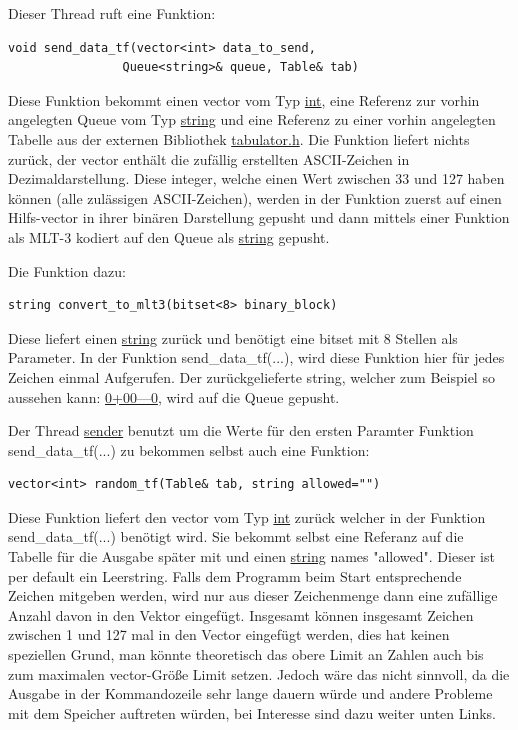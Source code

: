 \documentclass{article}
\begin{document}
Dieser Thread ruft eine Funktion:
\begin{lstlisting}
void send_data_tf(vector<int> data_to_send,
				Queue<string>& queue, Table& tab)
\end{lstlisting}

Diese Funktion bekommt einen vector vom Typ \underline{int}, eine Referenz zur vorhin angelegten Queue vom Typ \underline{string} und eine Referenz zu einer vorhin
angelegten Tabelle aus der externen Bibliothek \underline{tabulator.h}. Die Funktion liefert nichts zurück, der vector enthält die zufällig erstellten ASCII-Zeichen in Dezimaldarstellung.
Diese integer, welche einen Wert zwischen 33 und 127 haben können (alle zulässigen ASCII-Zeichen), werden in der Funktion zuerst auf einen Hilfs-vector in ihrer binären Darstellung
gepusht und dann mittels einer Funktion als MLT-3 kodiert auf den Queue als \underline{string} gepusht. 

Die Funktion dazu:
\begin{lstlisting}
string convert_to_mlt3(bitset<8> binary_block)
\end{lstlisting}

Diese liefert einen \underline{string} zurück und benötigt eine bitset mit 8 Stellen als Parameter. In der Funktion send\_data\_tf(...), wird diese Funktion hier für jedes Zeichen
einmal Aufgerufen. Der zurückgelieferte string, welcher zum Beispiel so aussehen kann: \underline{0+00---0}, wird auf die Queue gepusht.

Der Thread \underline{sender} benutzt um die Werte für den ersten Paramter Funktion send\_data\_tf(...) zu bekommen selbst auch eine Funktion:
\begin{lstlisting}
vector<int> random_tf(Table& tab, string allowed="")
\end{lstlisting}

Diese Funktion liefert den vector vom Typ \underline{int} zurück welcher in der Funktion send\_data\_tf(...) benötigt wird. Sie bekommt selbst eine Referanz auf die
Tabelle für die Ausgabe später mit und einen \underline{string} names "allowed". Dieser ist per default ein Leerstring. Falls dem Programm beim Start entsprechende Zeichen mitgeben
werden, wird nur aus dieser Zeichenmenge dann eine zufällige Anzahl davon in den Vektor eingefügt. Insgesamt können insgesamt Zeichen zwischen 1 und 127 mal in den Vector eingefügt
werden, dies hat keinen speziellen Grund, man könnte theoretisch das obere Limit an Zahlen auch bis zum maximalen vector-Größe Limit setzen. Jedoch wäre das nicht sinnvoll, da die Ausgabe
in der Kommandozeile sehr lange dauern würde und andere Probleme mit dem Speicher auftreten würden, bei Interesse sind dazu weiter unten Links. 
\end{document}

